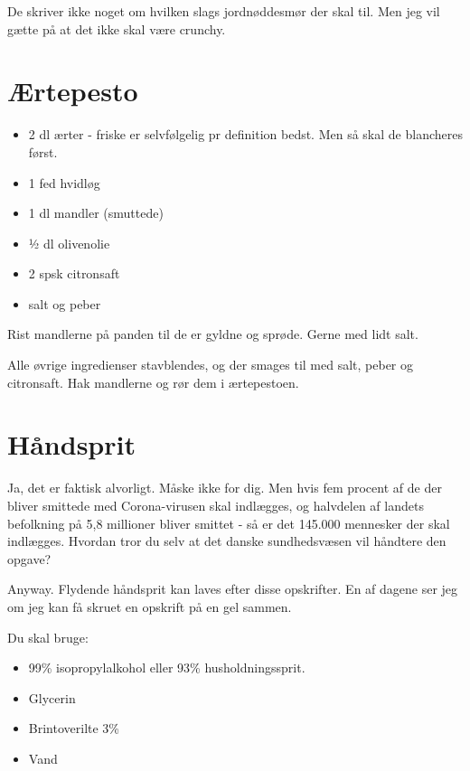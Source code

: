 \documentclass[
]{book}
\providecommand{\tightlist}{%
  \setlength{\itemsep}{0pt}\setlength{\parskip}{0pt}}
\begin{document}
De skriver ikke noget om hvilken slags jordnøddesmør der skal til. Men jeg vil gætte på at det ikke skal være crunchy.

\hypertarget{uxe6rtepesto}{%
\section{Ærtepesto}\label{uxe6rtepesto}}

\begin{itemize}
\tightlist
\item
  2 dl ærter - friske er selvfølgelig pr definition bedst. Men så skal de blancheres først.
\item
  1 fed hvidløg
\item
  1 dl mandler (smuttede)
\item
  ½ dl olivenolie
\item
  2 spsk citronsaft
\item
  salt og peber
\end{itemize}

Rist mandlerne på panden til de er gyldne og sprøde. Gerne med lidt salt.

Alle øvrige ingredienser stavblendes, og der smages til med salt, peber og citronsaft. Hak mandlerne og rør dem i ærtepestoen.

\hypertarget{huxe5ndsprit}{%
\section{Håndsprit}\label{huxe5ndsprit}}

Ja, det er faktisk alvorligt. Måske ikke for dig. Men hvis fem procent af de der bliver smittede med Corona-virusen skal indlægges, og halvdelen af landets befolkning på 5,8 millioner bliver smittet - så er det 145.000 mennesker der skal indlægges. Hvordan tror du selv at det danske sundhedsvæsen vil håndtere den opgave?

Anyway. Flydende håndsprit kan laves efter disse opskrifter. En af dagene ser jeg om jeg kan få skruet en opskrift på en gel sammen.

Du skal bruge:

\begin{itemize}
\tightlist
\item
  99\% isopropylalkohol eller 93\% husholdningssprit.
\item
  Glycerin
\item
  Brintoverilte 3\%
\item
  Vand
\end{itemize}
\end{document}
